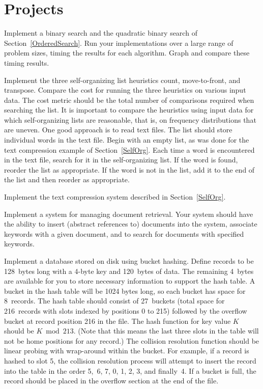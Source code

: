 \section{Projects}

\begin{projects}

\item
Implement a binary search and the quadratic binary search of
Section~\ref{OrderedSearch}.
Run your implementations over a large range of problem sizes, timing
the results for each algorithm.
Graph and compare these timing results.

\item
Implement the three self-organizing list heuristics count,
move-to-front, and transpose.
Compare the cost for running the three heuristics on various input
data.
The cost metric should be the total number of comparisons required
when searching the list.
It is important to compare the heuristics using input data for which
self-organizing lists are reasonable, that is, on frequency
distributions that are uneven.
One good approach is to read text files.
The list should store individual words in the text file.
Begin with an empty list, as was done for the text compression example
of Section~\ref{SelfOrg}.
Each time a word is encountered in the text file, search for it in the
self-organizing list.
If the word is found, reorder the list as appropriate.
If the word is not in the list, add it to the end of the list and then
reorder as appropriate.

\item
Implement the text compression system described in
Section~\ref{SelfOrg}.

\item
Implement a system for managing document retrieval.
Your system should have the ability to insert (abstract references to) 
documents into the system, associate keywords with a given document,
and to search for documents with specified keywords.

\item
Implement a database stored on disk using bucket hashing.
Define records to be 128~bytes long with a 4-byte key and 120~bytes of
data.
The remaining 4~bytes are available for you to store necessary
information to support the hash table.
A bucket in the hash table will be 1024 bytes long, so each bucket
has space for 8~records.
The hash table should consist of 27~buckets (total space for
216~records with slots indexed by positions 0 to 215) followed by the
overflow bucket at record position 216 in the file.
The hash function for key value \(K\) should be \(K \bmod 213\).
(Note that this means the last three slots in the table will not be
home positions for any record.)
The collision resolution function should be linear probing with
wrap-around within the bucket.
For example, if a record is hashed to slot 5, the collision resolution
process will attempt to insert the record into the table in the order
5,~6, 7, 0, 1, 2, 3, and finally~4.
If a bucket is full, the record should be placed in the overflow
section at the end of the file.


\end{projects}
